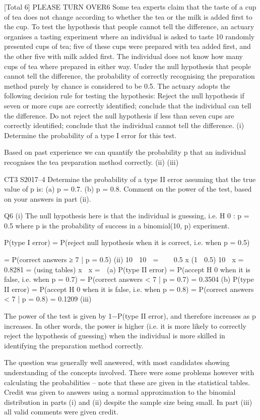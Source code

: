 \documentclass[a4paper,12pt]{article}
\begin{document}
[Total 6]
PLEASE TURN OVER6
Some tea experts claim that the taste of a cup of tea does not change according to
whether the tea or the milk is added first to the cup. To test the hypothesis that
people cannot tell the difference, an actuary organises a tasting experiment where an
individual is asked to taste 10 randomly presented cups of tea; five of these cups were
prepared with tea added first, and the other five with milk added first. The individual
does not know how many cups of tea where prepared in either way.
Under the null hypothesis that people cannot tell the difference, the probability of
correctly recognising the preparation method purely by chance is considered to be 0.5.
The actuary adopts the following decision rule for testing the hypothesis:
Reject the null hypothesis if seven or more cups are correctly identified; conclude
that the individual can tell the difference.
Do not reject the null hypothesis if less than seven cups are correctly identified;
conclude that the individual cannot tell the difference.
(i)
Determine the probability of a type I error for this test.

Based on past experience we can quantify the probability p that an individual
recognises the tea preparation method correctly.
(ii)
(iii)

CT3 S2017–4
Determine the probability of a type II error assuming that the true value of
p is:
(a) p = 0.7. 
(b) p = 0.8. 
Comment on the power of the test, based on your answers in part (ii).

Q6
(i)
The null hypothesis here is that the individual is guessing, i.e. H 0 : p = 0.5
where p is the probability of success in a binomial(10, p) experiment.

P(type I error) = P(reject null hypothesis when it is correct, i.e. when p = 0.5)

= P(correct answers ≥ 7 | p = 0.5)
(ii)
10
 10 
\;=\;    0.5 x (1  0.5) 10  x \;=  0.8281 \;= (using tables)
x 
x \;=  
(a) P(type II error) = P(accept H 0 when it is false, i.e. when p = 0.7) 
= P(correct answers < 7 | p = 0.7) = 0.3504 
(b)
P(type II error) = P(accept H 0 when it is false, i.e. when p = 0.8)
= P(correct answers < 7 | p = 0.8) = 0.1209
(iii)

The power of the test is given by 1−P(type II error), and therefore increases as
p increases. In other words, the power is higher (i.e. it is more likely to
correctly reject the hypothesis of guessing) when the individual is more skilled
in identifying the preparation method correctly.

The question was generally well answered, with most candidates
showing understanding of the concepts involved. There were some
problems however with calculating the probabilities – note that these
are given in the statistical tables. Credit was given to answers using a
normal approximation to the binomial distribution in parts (i) and (ii)
despite the sample size being small. In part (iii) all valid comments
were given credit.
\end{document}
